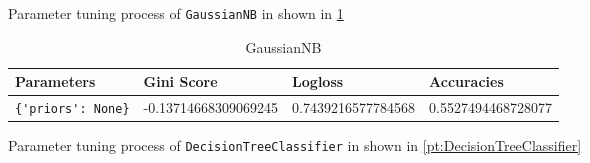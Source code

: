 Parameter tuning process of \verb|GaussianNB| in shown in \cref{pt:GaussianNB} 

\begin{table} \centering
\caption{GaussianNB} 
\label{pt:GaussianNB} 
\begin{tabular}{llll}\toprule\bfseries Parameters & \bfseries Gini Score & \bfseries Logloss &\bfseries Accuracies \\\midrule 
\verb|{'priors': None}| & -0.13714668309069245 & 0.7439216577784568 & 0.5527494468728077 \\ 
\bottomrule
\end{tabular}
\end{table} 

Parameter tuning process of \verb|DecisionTreeClassifier| in shown in \cref{pt:DecisionTreeClassifier} 

